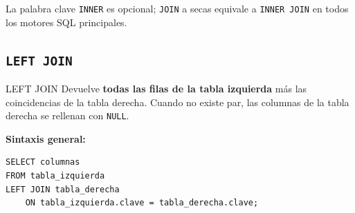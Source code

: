 \begin{nota}
  La palabra clave \texttt{INNER} es opcional; \texttt{JOIN} a secas equivale a
  \texttt{INNER JOIN} en todos los motores SQL principales.
\end{nota}

\subsection{\texttt{LEFT JOIN}}

\begin{definicion}{LEFT JOIN}
  Devuelve \textbf{todas las filas de la tabla izquierda} más las coincidencias de la tabla
  derecha. Cuando no existe par, las columnas de la tabla derecha se rellenan con
  \texttt{NULL}.
\end{definicion}

\begin{center}
\end{center}

\textbf{Sintaxis general:}

\begin{lstlisting}[style=sql, caption={Sintaxis de LEFT JOIN}]
SELECT columnas
FROM tabla_izquierda
LEFT JOIN tabla_derecha
    ON tabla_izquierda.clave = tabla_derecha.clave;
\end{lstlisting}

